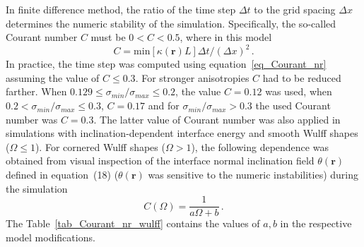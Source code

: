 In finite difference method, the ratio of the time step $\Delta t$ to the grid spacing $\Delta x$ determines the numeric stability of the simulation. Specifically, the so-called Courant number $C$ must be $0<C<0.5$, where in this model
\begin{equation}\label{eq_Courant_nr}
	C = \mathrm{min}[\kappa(\bm{r}) L]\Delta t/(\Delta x)^2  \,.
\end{equation}
In practice, the time step was computed using equation~\eqref{eq_Courant_nr} assuming the value of $C\leq0.3$. For stronger anisotropies $C$ had to be reduced farther. When $0.129\leq \sigma_{min}/\sigma_{max}\leq0.2$, the value $C=0.12$ was used, when $0.2 < \sigma_{min}/\sigma_{max}\leq0.3$, $C=0.17$ and for $\sigma_{min}/\sigma_{max} > 0.3$ the used Courant number was $C=0.3$. The latter value of Courant number was also applied in simulations with inclination-dependent interface energy and smooth Wulff shapes ($\Omega\leq1$). For cornered Wulff shapes ($\Omega>1$), the following dependence was obtained from visual inspection of the interface normal inclination field $\theta(\bm{r})$ defined in equation~(18) ($\theta(\bm{r})$ was sensitive to the numeric instabilities) during the simulation 
\begin{equation} \label{eq_Courant_nr_wulff}
	C(\Omega) = \frac{1}{a\Omega + b} \,.
\end{equation}
The Table~\ref{tab_Courant_nr_wulff} contains the values of $a,b$ in the respective model modifications.

